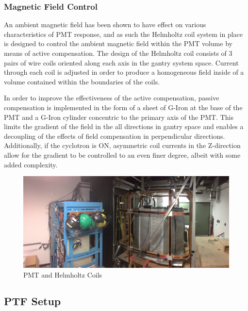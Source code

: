 \documentclass[twoside,letterpaper]{refart}
\begin{document}
\subsubsection{Magnetic Field Control}

An ambient magnetic field has been shown to have effect on various characteristics of PMT response, and as such the Helmholtz coil system in place is designed to control the ambient magnetic field within the PMT volume by means of active compensation.  The design of the Helmholtz coil consists of 3 pairs of wire coils oriented along each axis in the gantry system space.  Current through each coil is adjusted in order to produce a homogeneous field inside of a volume contained within the boundaries of the coils. 

In order to improve the effectiveness of the active compensation, passive compensation is implemented in the form of a sheet of G-Iron at the base of the PMT and a G-Iron cylinder concentric to the primary axis of the PMT.  This limits the gradient of the field in the all directions in gantry space and enables a decoupling of the effects of field compensation in perpendicular directions.  Additionally, if the cyclotron is ON, asymmetric coil currents in the Z-direction allow for the gradient to be controlled to an even finer degree, albeit with some added complexity.

\begin{figure}[!htpb] 
	\centering	
	\includegraphics[scale=0.05]{images/panoPTF}
	\caption{PMT and Helmholtz Coils}
	\label{pmtAndCoils}
\end{figure}

\FloatBarrier


\clearpage


\subsection{PTF Setup}
\end{document}
